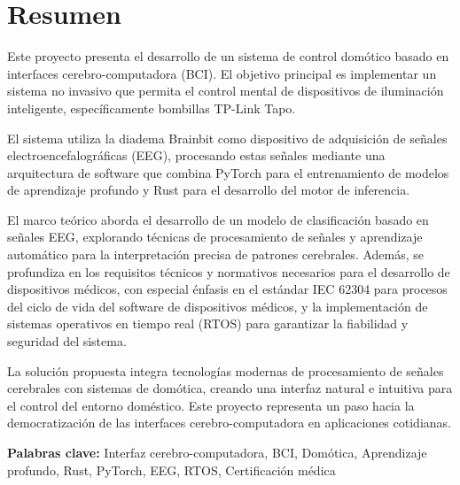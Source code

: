 \chapter*{Resumen}

Este proyecto presenta el desarrollo de un sistema de control domótico basado en interfaces cerebro-computadora (BCI). El objetivo principal es implementar un sistema no invasivo que permita el control mental de dispositivos de iluminación inteligente, específicamente bombillas TP-Link Tapo.

El sistema utiliza la diadema Brainbit como dispositivo de adquisición de señales electroencefalográficas (EEG), procesando estas señales mediante una arquitectura de software que combina PyTorch para el entrenamiento de modelos de aprendizaje profundo y Rust para el desarrollo del motor de inferencia. 

El marco teórico aborda el desarrollo de un modelo de clasificación basado en señales EEG, explorando técnicas de procesamiento de señales y aprendizaje automático para la interpretación precisa de patrones cerebrales. Además, se profundiza en los requisitos técnicos y normativos necesarios para el desarrollo de dispositivos médicos, con especial énfasis en el estándar IEC 62304 para procesos del ciclo de vida del software de dispositivos médicos, y la implementación de sistemas operativos en tiempo real (RTOS) para garantizar la fiabilidad y seguridad del sistema.

La solución propuesta integra tecnologías modernas de procesamiento de señales cerebrales con sistemas de domótica, creando una interfaz natural e intuitiva para el control del entorno doméstico. Este proyecto representa un paso hacia la democratización de las interfaces cerebro-computadora en aplicaciones cotidianas.

\vspace{0.5cm}
\noindent\textbf{Palabras clave:} Interfaz cerebro-computadora, BCI, Domótica, Aprendizaje profundo, Rust, PyTorch, EEG, RTOS, Certificación médica

